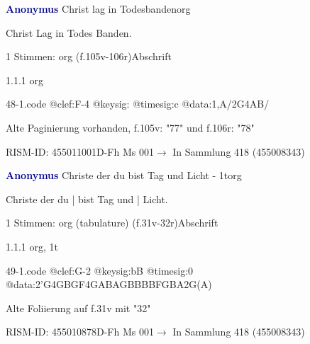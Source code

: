 \documentclass[twocolumn, 12pt]{book}
\begin{document}
\par \vspace{16pt} \textcolor{darkblue}{\textbf{Anonymus  }}\hfillplus{\textbf{[48]}}\newline Christ lag in Todesbanden\newline org
\par \begin{itshape}[f.105v, heading:] Christ Lag in Todes Banden.\end{itshape} 
\par \textcolor{darkblue}{}  1 Stimmen: org  (f.105v-106r)\newline Abschrift
\par 1.1.1  org  
\begin{filecontents*}{48-1.code}
@clef:F-4
@keysig:
@timesig:c
@data:1,A/2G4AB/%
\end{filecontents*}
\newline %
\par Alte Paginierung vorhanden, f.105v: "77" und f.106r: "78"
\par RISM-ID: 455011001\newline D-Fh  Ms 001\newline $\rightarrow$ In Sammlung 418 (455008343)
      
\par \vspace{16pt} \textcolor{darkblue}{\textbf{Anonymus  }}\hfillplus{\textbf{[49]}}\newline Christe der du bist Tag und Licht - 1t\newline org
\par \begin{itshape}[f.31v, at left:] Christe der du | bist Tag und | Licht.\end{itshape} 
\par \textcolor{darkblue}{}  1 Stimmen: org (tabulature)  (f.31v-32r)\newline Abschrift
\par 1.1.1  org, 1t  
\begin{filecontents*}{49-1.code}
@clef:G-2
@keysig:bB
@timesig:0
@data:2'G4GBGF4GABAGBBBBFGBA2G(A)
\end{filecontents*}
\newline %
\par Alte Foliierung auf f.31v mit "32"
\par RISM-ID: 455010878\newline D-Fh  Ms 001\newline $\rightarrow$ In Sammlung 418 (455008343)
      
\end{document}
